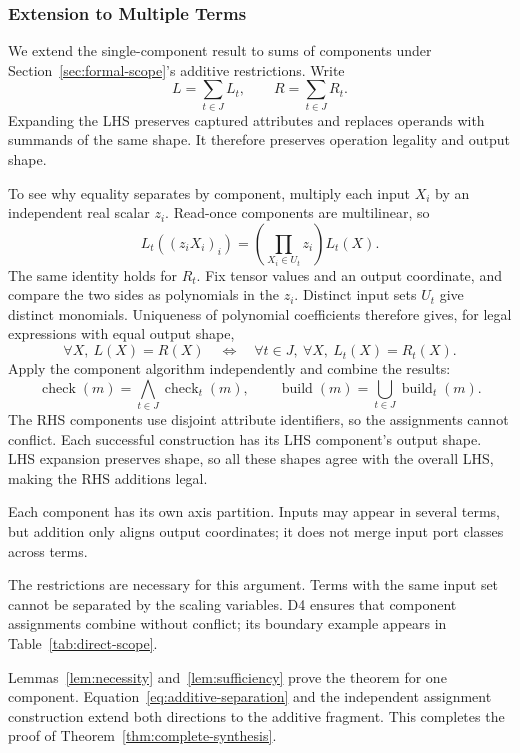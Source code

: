\subsubsection{Extension to Multiple Terms}
\label{sec:addition-proof}
We extend the single-component result to sums of components under
Section~\ref{sec:formal-scope}'s additive restrictions. Write
\begin{equation}
 L=\sum_{t\in J}L_t,\qquad R=\sum_{t\in J}R_t.
\end{equation}
Expanding the LHS preserves captured attributes and replaces operands with
summands of the same shape. It therefore preserves operation legality and
output shape.

To see why equality separates by component, multiply each input $X_i$ by
an independent real scalar $z_i$. Read-once components are multilinear, so
\begin{equation}
 L_t((z_iX_i)_i)=\left(\prod_{X_i\in U_t}z_i\right)L_t(X).
\end{equation}
The same identity holds for $R_t$. Fix tensor values and an output
coordinate, and compare the two sides as polynomials in the $z_i$.
Distinct input sets $U_t$ give distinct monomials. Uniqueness of polynomial
coefficients therefore gives, for legal expressions with equal output shape,
\begin{equation}
 \forall X,\ L(X)=R(X)
 \quad\iff\quad
 \forall t\in J,\ \forall X,\ L_t(X)=R_t(X).
 \label{eq:additive-separation}
\end{equation}
Apply the component algorithm independently and combine the results:
\begin{equation}
 \operatorname{check}(m)=\bigwedge_{t\in J}\operatorname{check}_t(m),
 \qquad
 \operatorname{build}(m)=\bigcup_{t\in J}\operatorname{build}_t(m).
 \label{eq:additive-construction}
\end{equation}
The RHS components use disjoint attribute identifiers, so the assignments
cannot conflict. Each successful construction has its LHS component's
output shape. LHS expansion preserves shape, so all these shapes agree
with the overall LHS, making the RHS additions legal.

Each component has its own axis partition. Inputs may appear in several
terms, but addition only aligns output coordinates; it does not merge input
port classes across terms.

The restrictions are necessary for this argument. Terms with the same
input set cannot be separated by the scaling variables. D4 ensures that
component assignments combine without conflict; its boundary example
appears in Table~\ref{tab:direct-scope}.

Lemmas~\ref{lem:necessity} and~\ref{lem:sufficiency} prove the theorem for
one component. Equation~\eqref{eq:additive-separation} and the independent
assignment construction extend both directions to the additive fragment.
This completes the proof of Theorem~\ref{thm:complete-synthesis}.
